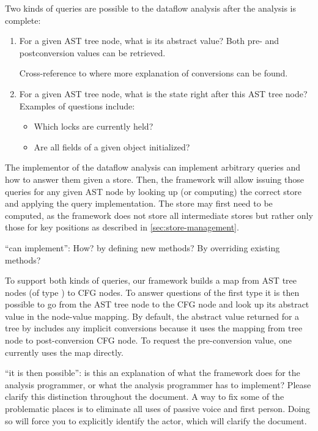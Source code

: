 Two kinds of queries are possible to the dataflow analysis after the analysis is complete:
\begin{enumerate}
    \item For a given AST tree node, what is its abstract value?  Both pre- and postconversion
    values can be retrieved.
\begin{workinprogress}
Cross-reference to where more explanation of conversions can be found.
\end{workinprogress}
    \item For a given AST tree node, what is the state right after this AST tree node?  Examples of questions
    include:
    \begin{itemize}
        \item Which locks are currently held?
        \item Are all fields of a given object initialized?
    \end{itemize}
\end{enumerate}

The implementor
of the dataflow analysis can implement arbitrary queries and how to answer them
given a store. Then, the framework will allow issuing those queries for
any given AST node by looking up (or computing) the correct store and applying the query
implementation.
The store may first need to be computed, as the framework does not store all intermediate
stores but rather only those for key positions as described in \autoref{sec:store-management}.

\begin{workinprogress}
``can implement'':  How?  by defining new methods?  By overriding existing
methods?
\end{workinprogress}

To support both kinds of queries, our framework builds a map from AST tree nodes (of type
) to CFG nodes.  To answer questions of the first type it is
then possible to go from the AST tree node to the CFG node and look up its abstract value in
the node-value mapping.  By default, the abstract value returned for a tree by  includes any implicit conversions because it uses the mapping
from tree node to post-conversion CFG node.  To request the pre-conversion value, one currently uses the  map directly.

\begin{workinprogress}
  ``it is then possible'':  is this an explanation of what the framework
  does for the analysis programmer, or what the analysis programmer has to
  implement?  Please clarify this distinction throughout the document.  A
  way to fix some of the problematic places is to eliminate all uses of
  passive voice and first person.  Doing so will force you to explicitly
  identify the actor, which will clarify the document.
\end{workinprogress}

